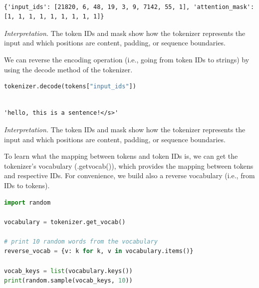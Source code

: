 \documentclass[../labs.tex]{subfiles}
\begin{document}
\begin{lstlisting}[basicstyle=\ttfamily\scriptsize,breaklines=true,breakatwhitespace=false,columns=fullflexible,keepspaces=true]

{'input_ids': [21820, 6, 48, 19, 3, 9, 7142, 55, 1], 'attention_mask': [1, 1, 1, 1, 1, 1, 1, 1, 1]}

\end{lstlisting}

\noindent\emph{Interpretation.} The token IDs and mask show how the tokenizer represents the input and which positions are content, padding, or sequence boundaries.



\noindent We can reverse the encoding operation (i.e., going from token IDs to strings) by using the decode method of the tokenizer.

\begin{lstlisting}[language=Python,basicstyle=\ttfamily\scriptsize,breaklines=true,breakatwhitespace=false,columns=fullflexible,keepspaces=true,numbers=none]
tokenizer.decode(tokens["input_ids"])
\end{lstlisting}

\hypertarget{res:lab02-text-01-t5-ipynb-7-07801de2b657}{}

\begin{lstlisting}[basicstyle=\ttfamily\scriptsize,breaklines=true,breakatwhitespace=false,columns=fullflexible,keepspaces=true]

'hello, this is a sentence!</s>'

\end{lstlisting}

\noindent\emph{Interpretation.} The token IDs and mask show how the tokenizer represents the input and which positions are content, padding, or sequence boundaries.



\noindent To learn what the mapping between tokens and token IDs is, we can get the tokenizer's vocabulary (.getvocab()), which provides the mapping between tokens and respective IDs. For convenience, we build also a reverse vocabulary (i.e., from IDs to tokens).

\begin{lstlisting}[language=Python,basicstyle=\ttfamily\scriptsize,breaklines=true,breakatwhitespace=false,columns=fullflexible,keepspaces=true,numbers=none]
import random 

vocabulary = tokenizer.get_vocab()

# print 10 random words from the vocabulary
reverse_vocab = {v: k for k, v in vocabulary.items()}

vocab_keys = list(vocabulary.keys())
print(random.sample(vocab_keys, 10))
\end{lstlisting}
\end{document}
